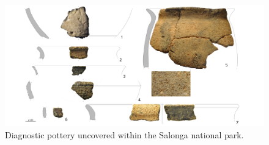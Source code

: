 \documentclass[a4paper]{article}
\begin{document}
\begin{figure}[p]
	\includegraphics[width=\textwidth]{Fig_SNP-03_Pottery.pdf}
	\caption{Diagnostic pottery uncovered within the Salonga national park.}
	\label{fig:snp.pottery}
\end{figure}
\end{document}
